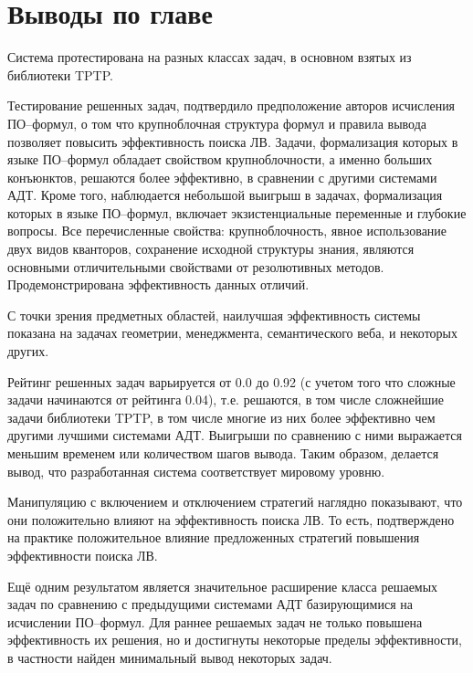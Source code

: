 \section{Выводы по главе}
Система протестирована на разных классах задач, в основном взятых из библиотеки TPTP.

Тестирование решенных задач, подтвердило предположение авторов исчисления ПО--формул, о том что крупноблочная структура формул и правила вывода позволяет повысить эффективность поиска ЛВ. Задачи, формализация которых в языке ПО--формул обладает свойством крупноблочности, а именно больших конъюнктов, решаются более эффективно, в сравнении с другими системами АДТ. Кроме того, наблюдается небольшой выигрыш в задачах, формализация которых в языке ПО--формул, включает экзистенциальные переменные и глубокие вопросы. Все перечисленные свойства: крупноблочность, явное использование двух видов кванторов, сохранение исходной структуры знания, являются основными отличительными свойствами от резолютивных методов. Продемонстрирована эффективность данных отличий.

С точки зрения предметных областей, наилучшая эффективность системы показана на задачах геометрии, менеджмента, семантического веба, и некоторых других.

Рейтинг решенных задач варьируется от 0.0 до 0.92 (с учетом того что сложные задачи начинаются от рейтинга 0.04), т.е. решаются, в том числе сложнейшие задачи библиотеки TPTP, в том числе многие из них более эффективно чем другими лучшими системами АДТ. Выигрыши по сравнению с ними выражается меньшим временем или количеством шагов вывода. Таким образом, делается вывод, что разработанная система соответствует мировому уровню.

Манипуляцию с включением и отключением стратегий наглядно показывают, что они положительно влияют на эффективность поиска ЛВ. То есть, подтверждено на практике положительное влияние предложенных стратегий повышения эффективности поиска ЛВ.

Ещё одним результатом является значительное расширение класса решаемых задач по сравнению с предыдущими системами АДТ базирующимися на исчислении ПО--формул. Для раннее решаемых задач не только повышена эффективность их решения, но и достигнуты некоторые пределы эффективности, в частности найден минимальный вывод некоторых задач.


